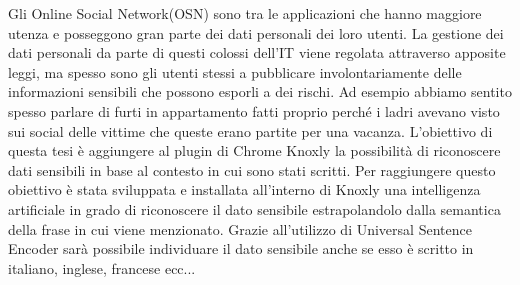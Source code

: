 Gli Online Social Network(OSN) sono tra le applicazioni che hanno maggiore utenza e posseggono gran parte dei dati personali dei loro utenti.\newline
La gestione dei dati personali da parte di questi colossi dell'IT viene regolata attraverso apposite leggi, ma spesso sono gli utenti stessi a pubblicare involontariamente delle informazioni sensibili che possono esporli a dei rischi. Ad esempio abbiamo sentito spesso parlare di furti in appartamento fatti proprio perché i ladri avevano visto sui social delle vittime che queste erano partite per una vacanza.\newline
L'obiettivo di questa tesi è aggiungere al plugin di Chrome Knoxly la possibilità di riconoscere dati sensibili in base al contesto in cui sono stati scritti. Per raggiungere questo obiettivo è stata sviluppata e installata all'interno di Knoxly una intelligenza artificiale in grado di riconoscere il dato sensibile estrapolandolo dalla semantica della frase in cui viene menzionato. Grazie all'utilizzo di Universal Sentence Encoder sarà possibile individuare il dato sensibile anche se esso è scritto in italiano, inglese, francese ecc...
